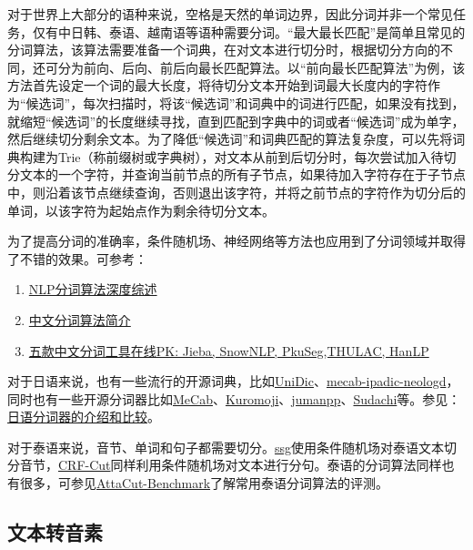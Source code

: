 \documentclass[cn,10pt,math=newtx,citestyle=gb7714-2015,bibstyle=gb7714-2015]{elegantbook}
\begin{document}
对于世界上大部分的语种来说，空格是天然的单词边界，因此分词并非一个常见任务，仅有中日韩、泰语、越南语等语种需要分词。“最大最长匹配”是简单且常见的分词算法，该算法需要准备一个词典，在对文本进行切分时，根据切分方向的不同，还可分为前向、后向、前后向最长匹配算法。以“前向最长匹配算法”为例，该方法首先设定一个词的最大长度，将待切分文本开始到词最大长度内的字符作为“候选词”，每次扫描时，将该“候选词”和词典中的词进行匹配，如果没有找到，就缩短“候选词”的长度继续寻找，直到匹配到字典中的词或者“候选词”成为单字，然后继续切分剩余文本。为了降低“候选词”和词典匹配的算法复杂度，可以先将词典构建为Trie（称前缀树或字典树），对文本从前到后切分时，每次尝试加入待切分文本的一个字符，并查询当前节点的所有子节点，如果待加入字符存在于子节点中，则沿着该节点继续查询，否则退出该字符，并将之前节点的字符作为切分后的单词，以该字符为起始点作为剩余待切分文本。

为了提高分词的准确率，条件随机场、神经网络等方法也应用到了分词领域并取得了不错的效果。可参考：

\begin{enumerate}
  \item \href{https://zhuanlan.zhihu.com/p/50444885}{NLP分词算法深度综述}
  \item \href{https://zhuanlan.zhihu.com/p/33261835}{中文分词算法简介}
  \item \href{https://zhuanlan.zhihu.com/p/64409753}{五款中文分词工具在线PK: Jieba, SnowNLP, PkuSeg,THULAC, HanLP}
\end{enumerate}

对于日语来说，也有一些流行的开源词典，比如\href{https://unidic.ninjal.ac.jp/}{UniDic}、\href{https://github.com/neologd/mecab-ipadic-neologd}{mecab-ipadic-neologd}，同时也有一些开源分词器比如\href{https://taku910.github.io/mecab/}{MeCab}、\href{https://www.atilika.org/}{Kuromoji}、\href{https://github.com/ku-nlp/jumanpp}{jumanpp}、\href{https://github.com/WorksApplications/Sudachi}{Sudachi}等。参见：\href{https://www.codercto.com/a/85083.html}{日语分词器的介绍和比较}。

对于泰语来说，音节、单词和句子都需要切分。\href{https://github.com/ponrawee/ssg}{ssg}使用条件随机场对泰语文本切分音节，\href{https://github.com/vistec-AI/crfcut}{CRF-Cut}同样利用条件随机场对文本进行分句。泰语的分词算法同样也有很多，可参见\href{https://pythainlp.github.io/attacut/benchmark.html}{AttaCut-Benchmark}了解常用泰语分词算法的评测。

\subsection{文本转音素}
\end{document}
